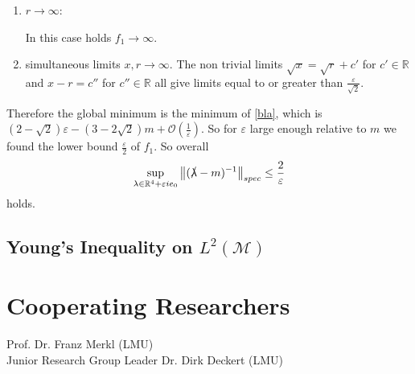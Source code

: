 \documentclass[b5paper,draft,openbib,12pt]{memoir}
\begin{document}
\begin{enumerate}[label=case \alph*),]
\item  \(r\rightarrow \infty\):

In this case holds \(f_1\rightarrow \infty\). 

\item simultaneous limits \(x,r\rightarrow \infty\). The non trivial limits \(\sqrt{x}=\sqrt{r}+c'\) 
for \(c'\in\mathbb{R}\) and \(x-r=c''\) for \(c''\in\mathbb{R}\) all give limits equal to or greater than
\(\frac{\varepsilon}{\sqrt{2}}\). 
 
\end{enumerate}
Therefore the global minimum is the minimum of \ref{bla}, which is 
\((2-\sqrt{2})\varepsilon - (3-2\sqrt{2})m + \mathcal{O}\left(\frac{1}{\varepsilon}\right)\).
So for \(\varepsilon\) large enough relative to \(m\) we found the 
lower bound \(\frac{\varepsilon}{2}\) of \(f_1\). So overall
\begin{equation}
\sup_{\lambda\in \mathbb{R}^4+\varepsilon i e_0} \left\| (\slashed{\lambda} - m)^{-1} \right\|_{spec} \le \frac{2}{\varepsilon}
\end{equation}
holds.


\section{Young's Inequality on \(L^2(\mathcal{M})\)}\label{Sec:Young}



\backmatter





%
%

\chapter{Cooperating Researchers} 
Prof. Dr. Franz Merkl (LMU)\\
Junior Research Group Leader Dr. Dirk Deckert (LMU)
\end{document}
